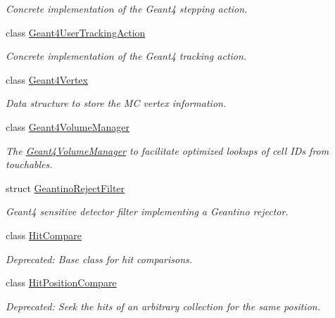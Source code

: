 \begin{DoxyCompactItemize}
\begin{DoxyCompactList}\small\item\em Concrete implementation of the Geant4 stepping action. \end{DoxyCompactList}\item 
class \hyperlink{class_d_d4hep_1_1_simulation_1_1_geant4_user_tracking_action}{Geant4\+User\+Tracking\+Action}
\begin{DoxyCompactList}\small\item\em Concrete implementation of the Geant4 tracking action. \end{DoxyCompactList}\item 
class \hyperlink{class_d_d4hep_1_1_simulation_1_1_geant4_vertex}{Geant4\+Vertex}
\begin{DoxyCompactList}\small\item\em Data structure to store the MC vertex information. \end{DoxyCompactList}\item 
class \hyperlink{class_d_d4hep_1_1_simulation_1_1_geant4_volume_manager}{Geant4\+Volume\+Manager}
\begin{DoxyCompactList}\small\item\em The \hyperlink{class_d_d4hep_1_1_simulation_1_1_geant4_volume_manager}{Geant4\+Volume\+Manager} to facilitate optimized lookups of cell I\+Ds from touchables. \end{DoxyCompactList}\item 
struct \hyperlink{struct_d_d4hep_1_1_simulation_1_1_geantino_reject_filter}{Geantino\+Reject\+Filter}
\begin{DoxyCompactList}\small\item\em Geant4 sensitive detector filter implementing a Geantino rejector. \end{DoxyCompactList}\item 
class \hyperlink{class_d_d4hep_1_1_simulation_1_1_hit_compare}{Hit\+Compare}
\begin{DoxyCompactList}\small\item\em Deprecated\+: Base class for hit comparisons. \end{DoxyCompactList}\item 
class \hyperlink{struct_d_d4hep_1_1_simulation_1_1_hit_position_compare}{Hit\+Position\+Compare}
\begin{DoxyCompactList}\small\item\em Deprecated\+: Seek the hits of an arbitrary collection for the same position. \end{DoxyCompactList}\item 

\end{DoxyCompactItemize}
